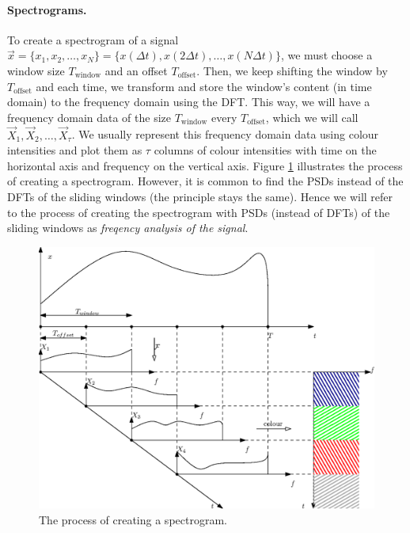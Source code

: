 		\paragraph{Spectrograms.}
			To create a spectrogram of a signal $\vec x = \{x_1, x_2, \dotsc, x_N\} = \{x(\Delta t), x(2\Delta t), \dotsc, x(N\Delta t)\}$, we must choose a window size $T_\text{window}$ and an offset $T_\text{offset}$. Then, we keep shifting the window by $T_\text{offset}$ and each time, we transform and store the window's content (in time domain) to the frequency domain using the DFT. This way, we will have a frequency domain data of the size $T_\text{window}$ every $T_\text{offset}$, which we will call $\vec X_1, \vec X_2, \dotsc, \vec X_\tau$. We usually represent this frequency domain data using colour intensities and plot them as $\tau$ columns of colour intensities with time on the horizontal axis and frequency on the vertical axis. Figure \ref{fig:spec} illustrates the process of creating a spectrogram. However, it is common to find the PSDs instead of the DFTs of the sliding windows (the principle stays the same). Hence we will refer to the process of creating the spectrogram with PSDs (instead of DFTs) of the sliding windows as \emph{freqency analysis of the signal}.
			\begin{figure}[ht]
				\centering
					\includegraphics{drawings/spec.eps}
				\caption{The process of creating a spectrogram.}
				\label{fig:spec}
			\end{figure}


